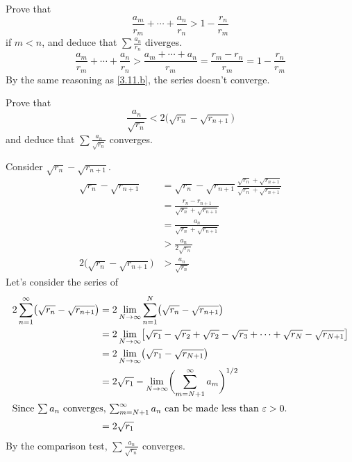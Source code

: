 \begin{exercise}
\[  \]
  \begin{exercise}[label = (\alph*)]
  \item
    Prove that
    \[
    \frac{a_m}{r_m} + \cdots + \frac{a_n}{r_n} > 1 - \frac{r_n}{r_m}
    \]
    if \(m < n\), and deduce that \(\sum\frac{a_n}{r_n}\) diverges.
    \[
    \frac{a_m}{r_m} + \cdots + \frac{a_n}{r_n} >
    \frac{a_m + \cdots + a_n}{r_m} = \frac{r_m - r_n}{r_m} =
    1 - \frac{r_n}{r_m}
    \]
    By the same reasoning as \cref{3.11.b}, the series doesn't converge.
  \item
    Prove that
    \[
    \frac{a_n}{\sqrt{r_n}} < 2\bigl(\sqrt{r_n} - \sqrt{r_{n + 1}}\bigr)
    \]
    and deduce that \(\sum\frac{a_n}{\sqrt{r_n}}\) converges.
    \par\smallskip
    Consider \(\sqrt{r_n} - \sqrt{r_{n + 1}}\).
    \begin{align*}
      \sqrt{r_n} - \sqrt{r_{n + 1}}
      & = \sqrt{r_n} - \sqrt{r_{n + 1}}
        \frac{\sqrt{r_n} + \sqrt{r_{n + 1}}}{\sqrt{r_n} + \sqrt{r_{n + 1}}}\\
      & = \frac{r_n - r_{n + 1}}{\sqrt{r_n} + \sqrt{r_{n + 1}}}\\
      & = \frac{a_n}{\sqrt{r_n} + \sqrt{r_{n + 1}}}\\
      & > \frac{a_n}{2\sqrt{r_n}}\\
      2\bigl(\sqrt{r_n} - \sqrt{r_{n + 1}}\bigr) & > \frac{a_n}{\sqrt{r_n}}
    \end{align*}
    Let's consider the series of
    \begin{align*}
      2\sum_{n = 1}^{\infty}\bigl(\sqrt{r_n} - \sqrt{r_{n + 1}}\bigr)
      & = 2\lim_{N\to\infty}\sum_{n = 1}^N
        \bigl(\sqrt{r_n} - \sqrt{r_{n + 1}}\bigr)\\
      & = 2\lim_{N\to\infty}\bigl[\sqrt{r_1} - \sqrt{r_2} + \sqrt{r_2} -
        \sqrt{r_3} + \cdots + \sqrt{r_N} - \sqrt{r_{N + 1}}\bigr]\\
      & = 2\lim_{N\to\infty}\bigl(\sqrt{r_1} - \sqrt{r_{N + 1}}\bigr)\\
      & = 2\sqrt{r_1} - \lim_{N\to\infty}
        \biggl(\sum_{m = N + 1}^{\infty}a_m\biggr)^{1/2}\\
      \intertext{Since \(\sum a_n\) converges, \(\sum_{m = N + 1}^{\infty}a_n\)
      can be made less than \(\varepsilon > 0\).}
      & = 2\sqrt{r_1}
    \end{align*}
    By the comparison test, \(\sum\frac{a_n}{\sqrt{r_n}}\) converges.

\end{exercise}
\end{exercise}
